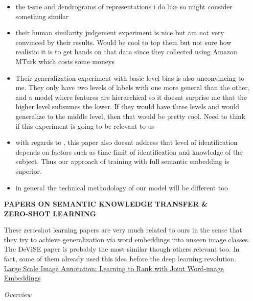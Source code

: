 \documentclass{report}
\begin{document}
\begin{itemize}
   \item the t-sne and dendrograms of representations i do like so might consider something similar
   \item their human similarity judgement experiment is nice but am not very convinced by their results. Would be cool to top them but not sure how realistic it is to get hands on that data since they collected using Amazon MTurk which costs some moneys
   \item Their generalization experiment with basic level bias is also unconvincing to me. They only have two levels of labels with one more general than the other, and a model where features are hierarchical so it doesnt surprise me that the higher level subsumes the lower. If they would have three levels and would generalize to the middle level, then that would be pretty cool. Need to think if this experiment is going to be relevant to us
   \item with regards to \cite{Rosch1976},\cite{Joliceur1984} this paper also doesnt address that level of identification depends on factors such as time-limit of identification and knowledge of the subject. Thus our approach of training with full semantic embedding is superior. 
   \item in general the technical methodology of our model will be different too
\end{itemize} 

\newpage

\textbf{PAPERS ON SEMANTIC KNOWLEDGE TRANSFER \& \\ZERO-SHOT LEARNING}

These zero-shot learning papers are very much related to ours in the sense that they try to achieve generalization via word embeddings into unseen image classes. The DeViSE paper is probably the most similar though others relevant too. In fact, some of them already used this idea before the deep learning revolution.\\

\underline{Large Scale Image Annotation: Learning to Rank with Joint Word-image Embeddings \cite{Weston2010}}

\textit{Overview}
\end{document}
